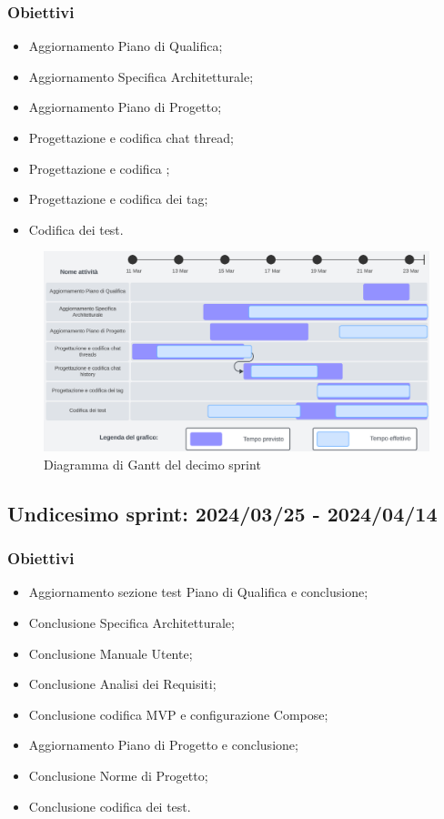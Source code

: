 \subsubsection{Obiettivi}
\begin{itemize}[itemsep=-2pt]
    \item Aggiornamento Piano di Qualifica;
    \item Aggiornamento Specifica Architetturale;
    \item Aggiornamento Piano di Progetto;
    \item Progettazione e codifica chat thread;
    \item Progettazione e codifica ;
    \item Progettazione e codifica dei tag;
    \item Codifica dei test.
\end{itemize}

\begin{figure}[h!]
    \centering
    \includegraphics[width=\textwidth]{Roadmap10sprint.png} 
    \caption{Diagramma di Gantt del decimo sprint}
    \label{fig:roadmaps10s}
\end{figure}
\newpage

\subsection{Undicesimo sprint: 2024/03/25 - 2024/04/14}
\subsubsection{Obiettivi}
\begin{itemize}[itemsep=-2pt]
    \item Aggiornamento sezione test Piano di Qualifica e conclusione;
    \item Conclusione Specifica Architetturale;
    \item Conclusione Manuale Utente;
    \item Conclusione Analisi dei Requisiti;
    \item Conclusione codifica MVP e configurazione  Compose;
    \item Aggiornamento Piano di Progetto e conclusione;
    \item Conclusione Norme di Progetto;
    \item Conclusione codifica dei test.
\end{itemize}

